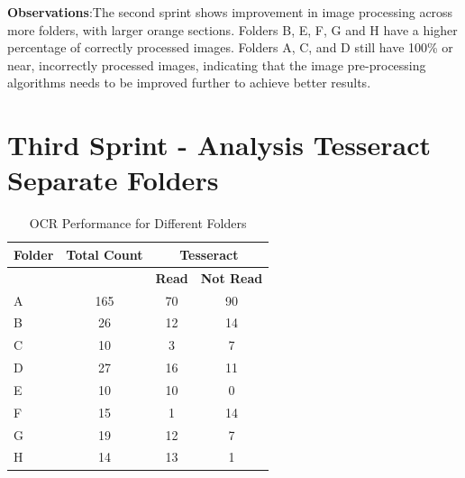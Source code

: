 \vspace{1in}

\textbf{Observations}:The second sprint shows improvement in image processing across more folders, with larger orange sections. Folders B, E, F, G and H have a higher percentage of correctly processed images. Folders A, C, and D still have 100\% or near, incorrectly processed images, indicating that the image pre-processing algorithms needs to be improved further to achieve better results.

\newpage

\section{Third Sprint - Analysis Tesseract Separate Folders}

\begin{table}[h]
    \centering
    \caption{OCR Performance for Different Folders}
    \label{tab:third_sprint_results}
    \begin{tabular}{|l|c|c|c|}
        \hline
        \textbf{Folder} & \textbf{Total Count} & \multicolumn{2}{c|}{\textbf{Tesseract}}                     \\
        \hline
                        &                      & \textbf{Read}                           & \textbf{Not Read} \\
        \hline
        A               & 165                  & 70                                      & 90                \\
        B               & 26                   & 12                                      & 14                \\
        C               & 10                   & 3                                       & 7                 \\
        D               & 27                   & 16                                      & 11                \\
        E               & 10                   & 10                                      & 0                 \\
        F               & 15                   & 1                                       & 14                \\
        G               & 19                   & 12                                      & 7                 \\
        H               & 14                   & 13                                      & 1                 \\
        \hline
    \end{tabular}
\end{table}
